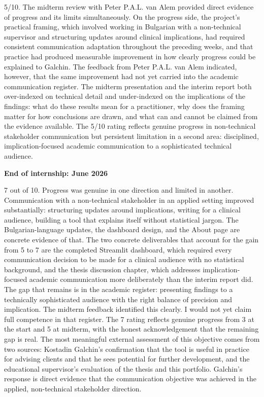 \documentclass[11pt,a4paper]{report}
\begin{document}
5/10. The midterm review with Peter P.A.L. van Alem provided direct evidence of progress and its limits
simultaneously. On the progress side, the project's practical framing, which involved working in
Bulgarian with a non-technical supervisor and structuring updates around clinical implications,
had required consistent communication adaptation throughout the preceding weeks, and that practice
had produced measurable improvement in how clearly progress could be explained to Galchin. The
feedback from Peter P.A.L. van Alem indicated, however, that the same improvement had not yet carried into the
academic communication register. The midterm presentation and the interim report both over-indexed
on technical detail and under-indexed on the implications of the findings: what do these results
mean for a practitioner, why does the framing matter for how conclusions are drawn, and what can
and cannot be claimed from the evidence available. The 5/10 rating reflects genuine progress in
non-technical stakeholder communication but persistent limitation in a second area: disciplined,
implication-focused academic communication to a sophisticated technical audience.

\textbf{End of internship: June 2026}

7 out of 10. Progress was genuine in one direction and limited in another. Communication with a
non-technical stakeholder in an applied setting improved substantially: structuring updates around
implications, writing for a clinical audience, building a tool that explains itself without
statistical jargon. The Bulgarian-language updates, the dashboard design, and the About page are
concrete evidence of that. The two concrete deliverables that account for the gain from 5 to 7
are the completed Streamlit dashboard, which required every communication decision to be made for
a clinical audience with no statistical background, and the thesis discussion chapter, which
addresses implication-focused academic communication more deliberately than the interim report did.
The gap that remains is in the academic register: presenting findings
to a technically sophisticated audience with the right balance of precision and implication. The
midterm feedback identified this clearly. I would not yet claim full competence in that register. The 7
rating reflects genuine progress from 3 at the start and 5 at midterm, with the honest
acknowledgement that the remaining gap is real. The most meaningful external assessment of this objective comes from two sources: Kostadin
Galchin's confirmation that the tool is useful in practice for advising clients and that he sees
potential for further development, and the educational supervisor's evaluation of the thesis and
this portfolio. Galchin's response is direct evidence that the communication objective was achieved
in the applied, non-technical stakeholder direction.
\end{document}
